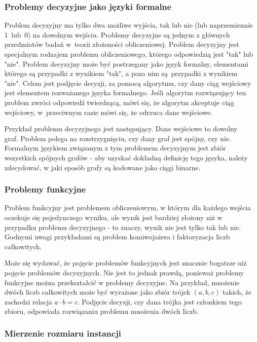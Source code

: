 		\subsubsection{Problemy decyzyjne jako języki formalne}

Problem decyzyjny ma tylko dwa możliwe wyjścia, tak lub nie (lub naprzemiennie 1~lub~0) na dowolnym wejściu.
Problemy decyzyjne są jednym z głównych przedmiotów badań w~teorii złożoności obliczeniowej. Problem decyzyjny jest specjalnym rodzajem problemu obliczeniowego, którego odpowiedzią jest "tak" lub "nie". Problem decyzyjny może być postrzegany jako język formalny, elementami którego są przypadki z wynikiem "tak", a poza nim są~przypadki z wynikiem "nie". Celem jest podjęcie decyzji, za pomocą algorytmu, czy dany ciąg wejściowy jest elementem rozważanego języka formalnego. Jeśli algorytm rozwiązujący ten problem zwróci odpowiedź twierdzącą, mówi się, że algorytm akceptuje ciąg wejściowy, w~przeciwnym razie mówi się, że odrzuca dane wejściowe.

Przykład problemu decyzyjnego jest następujący. Dane wejściowe to dowolny graf. Problem polega na rozstrzygnięciu, czy dany graf jest spójny, czy nie. Formalnym językiem związanym z tym problemem decyzyjnym jest zbiór wszystkich spójnych grafów - aby uzyskać dokładną definicję tego języka, należy zdecydować, w jaki sposób grafy są kodowane jako ciągi binarne.

		\subsubsection{Problemy funkcyjne}

Problem funkcyjny jest problemem obliczeniowym, w którym dla każdego wejścia oczekuje się pojedynczego wyniku, ale wynik jest bardziej złożony niż w przypadku problemu decyzyjnego - to znaczy, wynik nie jest tylko tak lub nie. Godnymi uwagi przykładami są problem komiwojażera i faktoryzacja liczb całkowitych.

Może się wydawać, że pojęcie problemów funkcyjnych jest znacznie bogatsze niż pojęcie problemów decyzyjnych. Nie jest to jednak prawdą, ponieważ problemy funkcyjne można przekształcić w problemy decyzyjne. Na przykład, mnożenie dwóch liczb całkowitych może być wyrażone jako zbiór trójek $(a, b, c)$ takich, że zachodzi relacja $a \cdot b = c$. Podjęcie decyzji, czy dana trójka jest członkiem tego zbioru, odpowiada rozwiązaniu problemu mnożenia dwóch liczb.

		\subsubsection{Mierzenie rozmiaru instancji}

